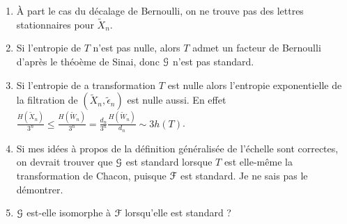 \documentclass[12pt,a4paper]{article}
\begin{document}
\begin{enumerate}
\item \`A part le cas du décalage de Bernoulli, on ne trouve pas des lettres 
stationnaires pour $\widetilde{X}_n$. 

\item Si l'entropie de $T$ n'est pas nulle, alors $T$ admet un facteur 
de Bernoulli d'après le théoème de Sinai, donc $\EuScript{G}$ n'est pas standard. 

\item Si l'entropie de a transformation $T$ est nulle alors l'entropie exponentielle de la 
filtration de $(\widetilde{X}_n, \widetilde{\epsilon}_n)$ est nulle aussi. 
En effet $\frac{H(\widetilde{X}_n)}{3^n} \leq \frac{H(\widetilde{W}_n)}{3^n} = \frac{d_n}{3^n}\frac{H(\widetilde{W}_n)}{d_n} \sim 3h(T)$.

\item Si mes idées à propos de la définition généralisée de l'échelle sont correctes, 
on devrait trouver que $\EuScript{G}$ est standard lorsque $T$ est elle-même la transformation de 
Chacon, puisque $\EuScript{F}$ est standard. Je ne sais pas le démontrer. 

\item $\EuScript{G}$ est-elle isomorphe à $\EuScript{F}$ lorsqu'elle est standard ? 
\end{enumerate}
\end{document}
